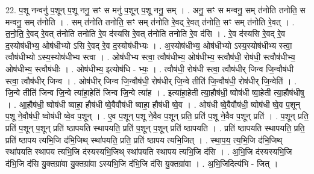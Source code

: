 \documentclass[17pt]{extarticle}
\begin{document}
22. प॒शू नन्वनु॑ प॒शून् प॒शू ननु॒ सꣳ स मनु॑ प॒शून् प॒शू ननु॒ सम् । . अनु॒ सꣳ स मन्वनु॒ सम् त॑नोति तनोति॒ स मन्वनु॒ सम् त॑नोति । . सम् त॑नोति तनोति॒ सꣳ सम् त॑नोति रे॒वद् रे॒वत् त॑नोति॒ सꣳ सम् त॑नोति रे॒वत् । . त॒नो॒ति॒ रे॒वद् रे॒वत् त॑नोति तनोति रे॒व द॑स्यसि रे॒वत् त॑नोति तनोति रे॒व द॑सि । . रे॒व द॑स्यसि रे॒वद् रे॒व द॒स्योष॑धीभ्य॒ ओष॑धीभ्यो ऽसि रे॒वद् रे॒व द॒स्योष॑धीभ्यः । . अ॒स्योष॑धीभ्य॒ ओष॑धीभ्यो ऽस्य॒स्योष॑धीभ्य स्त्वा॒ त्वौष॑धीभ्यो ऽस्य॒स्योष॑धीभ्य स्त्वा । . ओष॑धीभ्य स्त्वा॒ त्वौष॑धीभ्य॒ ओष॑धीभ्य॒ स्त्वौष॑धी॒ रोष॑धी॒ स्त्वौष॑धीभ्य॒ ओष॑धीभ्य॒ स्त्वौष॑धीः । . ओष॑धीभ्य॒ इत्योष॑धि - भ्यः॒ । . त्वौष॑धी॒ रोष॑धी स्त्वा॒ त्वौष॑धीर् जिन्व जि॒न्वौष॑धी स्त्वा॒ त्वौष॑धीर् जिन्व । . ओष॑धीर् जिन्व जि॒न्वौष॑धी॒ रोष॑धीर् जि॒न्वे तीति॑ जि॒न्वौष॑धी॒ रोष॑धीर् जि॒न्वेति॑ । . जि॒न्वे तीति॑ जिन्व जि॒न्वे त्या॑हा॒हेति॑ जिन्व जि॒न्वे त्या॑ह । . इत्या॑हा॒हेती त्या॒हौष॑धी॒ ष्वोष॑धी ष्वा॒हेती त्या॒हौष॑धीषु । . आ॒हौष॑धी॒ ष्वोष॑धी ष्वाहा॒ हौष॑धी ष्वे॒वैवौष॑धी ष्वाहा॒ हौष॑धी ष्वे॒व । . ओष॑धी ष्वे॒वैवौष॑धी॒ ष्वोष॑धी ष्वे॒व प॒शून् प॒शू ने॒वौष॑धी॒ ष्वोष॑धी ष्वे॒व प॒शून् । . ए॒व प॒शून् प॒शू ने॒वैव प॒शून् प्रति॒ प्रति॑ प॒शू ने॒वैव प॒शून् प्रति॑ । . प॒शून् प्रति॒ प्रति॑ प॒शून् प॒शून् प्रति॑ ष्ठापयति स्थापयति॒ प्रति॑ प॒शून् प॒शून् प्रति॑ ष्ठापयति । . प्रति॑ ष्ठापयति स्थापयति॒ प्रति॒ प्रति॑ ष्ठापय त्यभि॒जि द॑भि॒जिथ् स्था॑पयति॒ प्रति॒ प्रति॑ ष्ठापय त्यभि॒जित् । . स्था॒प॒य॒ त्य॒भि॒जि द॑भि॒जिथ् स्था॑पयति स्थापय त्यभि॒जि द॑स्यस्यभि॒जिथ् स्था॑पयति स्थापय त्यभि॒जि द॑सि । . अ॒भि॒जि द॑स्यस्यभि॒जि द॑भि॒जि द॑सि यु॒क्तग्रा॑वा यु॒क्तग्रा॑वा ऽस्यभि॒जि द॑भि॒जि द॑सि यु॒क्तग्रा॑वा । . अ॒भि॒जिदित्य॑भि - जित् । \newline
\end{document}

